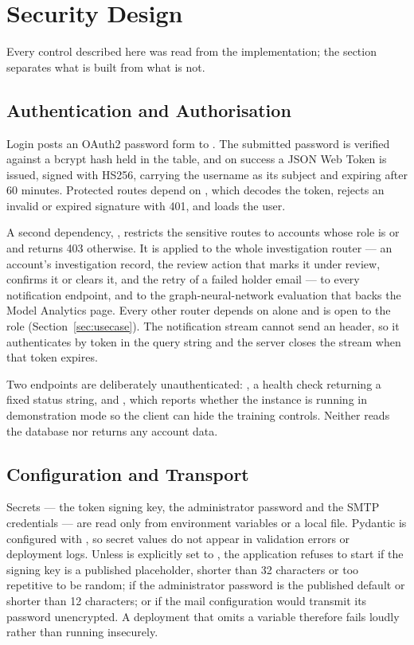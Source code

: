 \section{Security Design}
Every control described here was read from the implementation; the section separates what is built from what is not.

\subsection{Authentication and Authorisation}\label{sec:authz}
Login posts an OAuth2 password form to . The submitted password is verified against a bcrypt hash held in the  table, and on success a JSON Web Token is issued, signed with HS256, carrying the username as its subject and expiring after 60 minutes. Protected routes depend on , which decodes the token, rejects an invalid or expired signature with 401, and loads the user.

A second dependency, , restricts the sensitive routes to accounts whose role is  or  and returns 403 otherwise. It is applied to the whole investigation router --- an account's investigation record, the review action that marks it under review, confirms it or clears it, and the retry of a failed holder email --- to every notification endpoint, and to the graph-neural-network evaluation that backs the Model Analytics page. Every other router depends on  alone and is open to the  role (Section~\ref{sec:usecase}). The notification stream cannot send an  header, so it authenticates by token in the query string and the server closes the stream when that token expires.

Two endpoints are deliberately unauthenticated: , a health check returning a fixed status string, and , which reports whether the instance is running in demonstration mode so the client can hide the training controls. Neither reads the database nor returns any account data.

\subsection{Configuration and Transport}
Secrets --- the token signing key, the administrator password and the SMTP credentials --- are read only from environment variables or a local  file. Pydantic is configured with , so secret values do not appear in validation errors or deployment logs. Unless  is explicitly set to , the application refuses to start if the signing key is a published placeholder, shorter than 32 characters or too repetitive to be random; if the administrator password is the published default or shorter than 12 characters; or if the mail configuration would transmit its password unencrypted. A deployment that omits a variable therefore fails loudly rather than running insecurely.

